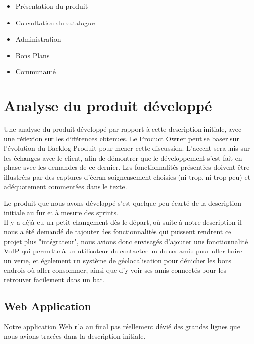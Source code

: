 \documentclass{report}
\begin{document}
		\begin{itemize}
			\item Présentation du produit
			\item Consultation du catalogue
			\item Administration
			\item Bons Plans
			\item Communauté
		\end{itemize}


\chapter{Analyse du produit développé} %


	Une analyse du produit développé par rapport à cette description initiale, avec une réflexion sur les différences obtenues.  Le Product Owner peut se baser sur l’évolution du Backlog Produit pour mener cette discussion.  L’accent sera mis sur les échanges avec le client, afin de démontrer que le développement s’est fait en phase avec les demandes de ce dernier.  Les fonctionnalités présentées doivent être illustrées par des captures d’écran soigneusement choisies (ni trop, ni trop peu) et adéquatement commentées dans le texte. 

	Le produit que nous avons développé s'est quelque peu écarté de la description initiale au fur et à mesure des sprints.\\
	Il y a déjà eu un petit changement dès le départ, où suite à notre description il nous a été demandé de rajouter des fonctionnalités qui puissent rendrent ce projet plus "intégrateur", nous avions donc envisagés d'ajouter une fonctionnalité VoIP qui permette à un utilisateur de contacter un de ses amis pour aller boire un verre, et également un système de géolocalisation pour dénicher les bons endrois où aller consommer, ainsi que d'y voir ses amis connectés pour les retrouver facilement dans un bar.\\

	\section{Web Application}

		Notre application Web n'a au final pas réellement dévié des grandes lignes que nous avions tracées dans la description initiale.\\

		
\end{document}

